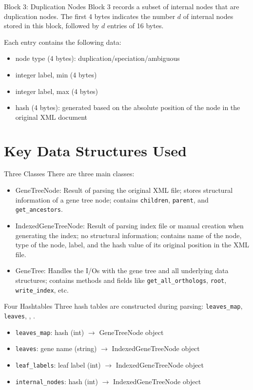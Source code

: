 \documentclass{beamer}
\begin{document}
\begin{frame}{Block 3: Duplication Nodes}
    Block 3 records a subset of internal nodes that are duplication nodes. The first 4 bytes indicates the number $d$ of internal nodes stored in this block, followed by $d$ entries of 16 bytes.

    Each entry contains the following data:
    \begin{itemize}
        \item node type (4 bytes): duplication/speciation/ambiguous
        \item integer label, min (4 bytes)
        \item integer label, max (4 bytes)
        \item hash (4 bytes): generated based on the absolute position of the node in the original XML document
    \end{itemize}
\end{frame}

\section{Key Data Structures Used}

\begin{frame}{Three Classes}
    There are three main classes:
    \begin{itemize}
        \item GeneTreeNode: Result of parsing the original XML file; stores structural information of a gene tree node; contains \texttt{children}, \texttt{parent}, and \texttt{get\_ancestors}.
        \item IndexedGeneTreeNode: Result of parsing index file or manual creation when generating the index; no structural information; contains name of the node, type of the node, label, and the hash value of its original position in the XML file.
        \item GeneTree: Handles the I/Os with the gene tree and all underlying data structures; contains methods and fields like \texttt{get\_all\_orthologs}, \texttt{root}, \texttt{write\_index}, etc.
    \end{itemize}
\end{frame}

\begin{frame}{Four Hashtables}
    Three hash tables are constructed during parsing: \texttt{leaves\_map}, \texttt{leaves}, , .
    \begin{itemize}
        \item \texttt{leaves\_map}: hash (int) $\to$ GeneTreeNode object
        \item \texttt{leaves}: gene name (string) $\to$ IndexedGeneTreeNode object
        \item \texttt{leaf\_labels}: leaf label (int) $\to$ IndexedGeneTreeNode object
        \item \texttt{internal\_nodes}: hash (int) $\to$ IndexedGeneTreeNode object
    \end{itemize}
\end{frame}
\end{document}
